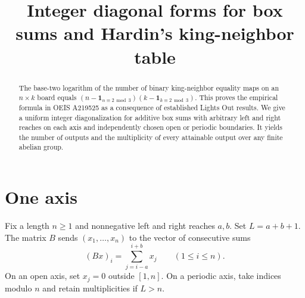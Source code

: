 \documentclass[11pt]{article}
\title{Integer diagonal forms for box sums and Hardin's king-neighbor table}
\author{}
\date{}
\begin{document}
\maketitle
\begin{abstract}
The base-two logarithm of the number of binary king-neighbor equality maps on an $n\times k$ board equals $(n-\mathbf1_{n\equiv2\bmod3})(k-\mathbf1_{k\equiv2\bmod3})$. This proves the empirical formula in OEIS A219525 as a consequence of established Lights Out results. We give a uniform integer diagonalization for additive box sums with arbitrary left and right reaches on each axis and independently chosen open or periodic boundaries. It yields the number of outputs and the multiplicity of every attainable output over any finite abelian group.
\end{abstract}

\section{One axis}
Fix a length $n\ge1$ and nonnegative left and right reaches $a,b$. Set $L=a+b+1$. The matrix $B$ sends $(x_1,\ldots,x_n)$ to the vector of consecutive sums
\[
 (Bx)_i=\sum_{j=i-a}^{i+b}x_j\qquad (1\le i\le n).
\]
On an open axis, set $x_j=0$ outside $[1,n]$. On a periodic axis, take indices modulo $n$ and retain multiplicities if $L>n$.
\end{document}
